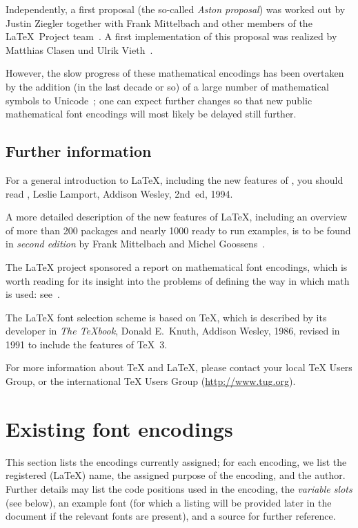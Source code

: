 \documentclass{ltxguide}[1994/11/20]
\begin{document}
Independently, a first proposal (the so-called \emph{Aston proposal}) was worked
out by Justin Ziegler together with Frank Mittelbach and other members of the
\LaTeX\ Project team~\cite{ziegler}. A first implementation of
this proposal was realized by Matthias Clasen und Ulrik
Vieth~\cite{clasen,clasen-vieth}.

However, the slow progress of these mathematical encodings has been
overtaken by the addition (in the last decade or so) of a large number
of mathematical symbols to Unicode~\cite{beeton}; one can expect
further changes so that new public mathematical font encodings will
most likely be delayed still further.



\subsection{Further information}

For a general introduction to \LaTeX, including the new features of
\LaTeXe, you should read \emph{\LaTeXbook},
Leslie Lamport, Addison Wesley, 2nd~ed, 1994.

A more detailed description of the new features of \LaTeX, including an
overview of more than 200 packages and nearly 1000 ready to run examples, is
to be found in \emph{\LaTeXcomp{} second edition} by Frank Mittelbach and
Michel Goossens~\cite{A-W:MG2004}.

The \LaTeX{} project sponsored a report on mathematical %
font encodings, which
is worth reading for its insight into the problems of defining the way
in which math is used: see~\cite{ziegler,clasen,clasen-vieth}.

The \LaTeX{} font selection scheme is based on \TeX, which is described
by its developer in \emph{The \TeX book}, Donald E.~Knuth, Addison
Wesley, 1986, revised in 1991 to include the features of \TeX~3.

For more information about \TeX{} and \LaTeX, please contact your local
\TeX{} Users Group, or the international \TeX{} Users Group
(\url{http://www.tug.org}).



\section{Existing font encodings}

This section lists the encodings currently assigned; for each
encoding, we list the registered (\LaTeX{}) name, the assigned purpose
of the encoding, and the author.  Further details may list the code
positions used in the encoding, the \emph{variable slots} (see below),
an example font (for which a listing will be provided later in the
document if the relevant fonts are present), and a source for further
reference.
\end{document}
